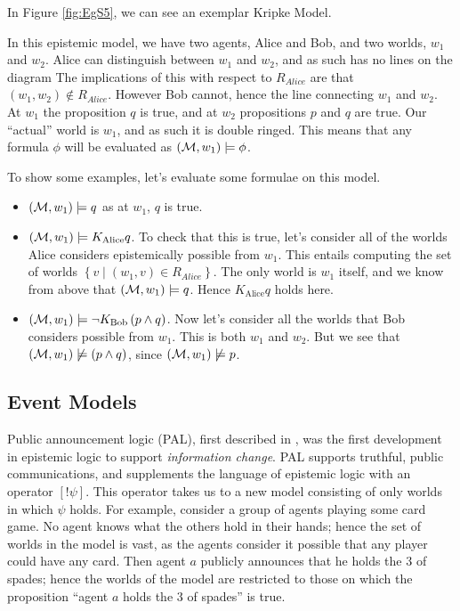 \documentclass[10pt, a4paper]{report}
\begin{document}
In Figure \ref{fig:EgS5}, we can see an exemplar Kripke Model.

In this epistemic model, we have two agents, Alice and Bob, and two worlds,
$w_1$ and $w_2$. Alice can distinguish between $w_1$ and $w_2$, and as such has
no lines on the diagram The implications of this with respect to $R_{Alice}$ are
that $(w_1, w_2) \not \in R_{Alice}$. However Bob cannot, hence the line
connecting $w_1$ and $w_2$. At $w_1$ the proposition $q$ is true, and at $w_2$
propositions $p$ and $q$ are true. Our ``actual'' world is $w_1$, and as such it
is double ringed. This means that any formula $\phi$ will be evaluated as
$(\mathcal{M}, w_1) \models \phi$.

To show some examples, let's evaluate some formulae on this model.

\begin{itemize}
\item $(\mathcal{M}, w_1) \models q$ as at $w_1$, $q$ is true.
\item $(\mathcal{M}, w_1) \models K_{\text{Alice}} q$. To check that this is true,
  let's consider all of the worlds Alice considers epistemically possible from $w_1$. This
  entails computing the set of worlds $\left\{ v \mid (w_1, v) \in R_{Alice}
  \right\}$. The only world is $w_1$ itself, and we know from above that
  $(\mathcal{M}, w_1) \models q$. Hence $K_{\text{Alice}} q$ holds here.
\item $(\mathcal{M}, w_1) \models \neg K_{\text{Bob}} \left( p \land q \right)$. Now
  let's consider all the worlds that Bob considers possible from $w_1$. This is
  both $w_1$ and $w_2$. But we see that $(\mathcal{M}, w_1) \not \models (p \land
  q)$, since $(\mathcal{M}, w_1) \not \models p$. 
\end{itemize}

\subsection{Event Models}
\label{sec:Event Models}


Public announcement logic (PAL), first described in \cite{PAL}, was the first
development in epistemic logic to support \emph{information change}. PAL
supports truthful, public communications, and supplements the language of
epistemic logic with an operator $[!\psi]$. This operator takes us to a new
model consisting of only worlds in which $\psi$ holds. For example, consider a
group of agents playing some card game. No agent knows what the others hold in
their hands; hence the set of worlds in the model is vast, as the agents
consider it possible that any player could have any card. Then agent $a$
publicly announces that he holds the 3 of spades; hence the worlds of the model
are restricted to those on which the proposition ``agent $a$ holds the 3 of
spades'' is true.
\end{document}
